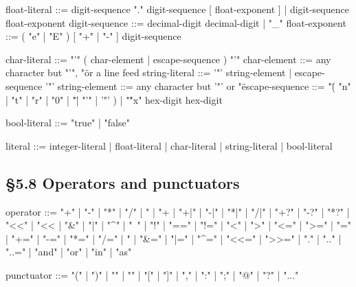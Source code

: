 \label{gram:float-literal}
\begin{grammar}
float-literal    ::= digit-sequence "." digit-sequence [ float-exponent ]
                   | digit-sequence float-exponent
digit-sequence   ::= decimal-digit { decimal-digit | "_" }
float-exponent   ::= ( "e" | "E" ) [ "+" | "-" ] digit-sequence
\end{grammar}

\label{gram:string-literal}
\begin{grammar}
char-literal     ::= "'" ( char-element | escape-sequence ) "'"
char-element     ::= any character but "'", "\" or a line feed
string-literal   ::= '"' { string-element | escape-sequence } '"'
string-element   ::= any character but '"' or "\"
escape-sequence  ::= "\" ( "n" | "t" | "r" | "0" | "\" | "'" | '"' )
                   | "\" "x" hex-digit hex-digit
\end{grammar}

\label{gram:bool-literal}
\begin{grammar}
bool-literal     ::= "true" | "false"

literal          ::= integer-literal | float-literal | char-literal
                   | string-literal | bool-literal
\end{grammar}

\subsection*{§5.8 Operators and punctuators}
\label{gram:operator}\label{gram:punctuator}
\begin{grammar}
operator         ::=
    "+"   | "-"   | "*"   | "/"   | "%
  | "+%
  | "+|"  | "-|"  | "*|"  | "/|"                   %
  | "+?"  | "-?"  | "*?"                           %
  | "<<"  | "<<%
  | "&"   | "|"   | "^"   | "~"   | "!"
  | "=="  | "!="  | "<"   | ">"   | "<="  | ">="
  | "="   | "+="  | "-="  | "*="  | "/="  | "%
  | "&="  | "|="  | "^="  | "<<=" | ">>="
  | "."   | ".."  | "..="
  | "and" | "or"  | "in"  | "as"

punctuator       ::=
    "("   | ")"   | "{"   | "}"   | "["   | "]"
  | ","   | ":"   | ";"   | "@"   | "?"   | "..."

\end{grammar}


